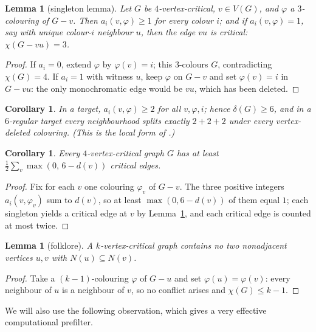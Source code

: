 \documentclass[11pt]{article}
\newtheorem{lemma}[theorem]{Lemma}
\newtheorem{corollary}[theorem]{Corollary}
\theoremstyle{remark}
\begin{document}
\begin{lemma}[singleton lemma]\label{lem:singleton}
Let $G$ be $4$-vertex-critical, $v\in V(G)$, and $\varphi$ a $3$-colouring of
$G-v$. Then $a_i(v,\varphi)\ge 1$ for every colour $i$; and if $a_i(v,\varphi)=1$,
say with unique colour-$i$ neighbour $u$, then the edge $vu$ is critical:
$\chi(G-vu)=3$.
\end{lemma}

\begin{proof}
If $a_i=0$, extend $\varphi$ by $\varphi(v)=i$; this $3$-colours $G$,
contradicting $\chi(G)=4$. If $a_i=1$ with witness $u$, keep $\varphi$ on
$G-v$ and set $\varphi(v)=i$ in $G-vu$: the only monochromatic edge would be
$vu$, which has been deleted.
\end{proof}

\begin{corollary}\label{cor:delta6}
In a target, $a_i(v,\varphi)\ge 2$ for all $v,\varphi,i$; hence $\delta(G)\ge 6$,
and in a $6$-regular target every neighbourhood splits exactly $2+2+2$ under every
vertex-deleted colouring. \textup{(}This is the local form of
\cite[Prop.~5.1]{SkSt25}.\textup{)}
\end{corollary}

\begin{corollary}\label{cor:quant}
Every $4$-vertex-critical graph $G$ has at least
$\tfrac12\sum_{v}\max(0,\,6-d(v))$ critical edges.
\end{corollary}

\begin{proof}
Fix for each $v$ one colouring $\varphi_v$ of $G-v$. The three positive integers
$a_i(v,\varphi_v)$ sum to $d(v)$, so at least $\max(0,6-d(v))$ of them equal $1$;
each singleton yields a critical edge at $v$ by Lemma~\ref{lem:singleton}, and
each critical edge is counted at most twice.
\end{proof}

\begin{lemma}[folklore]\label{lem:comparable}
A $k$-vertex-critical graph contains no two nonadjacent vertices $u,v$ with
$N(u)\subseteq N(v)$.
\end{lemma}

\begin{proof}
Take a $(k-1)$-colouring $\varphi$ of $G-u$ and set $\varphi(u)=\varphi(v)$:
every neighbour of $u$ is a neighbour of $v$, so no conflict arises and
$\chi(G)\le k-1$.
\end{proof}

We will also use the following observation, which gives a very effective
computational prefilter.
\end{document}
